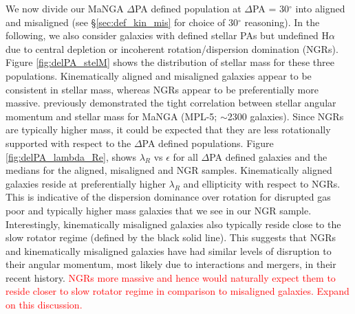 \documentclass[fleqn,usenatbib]{mnras}
\newcommand{\red}[1]{{\textcolor{red}{#1}}}
\begin{document}
We now divide our MaNGA $\Delta$PA defined population at $\Delta$PA = 30$^{\circ}$ into aligned and misaligned (see \S\ref{sec:def_kin_mis} for choice of 30$^{\circ}$ reasoning). In the following, we also consider galaxies with defined stellar PAs but undefined H$\alpha$ due to central depletion or incoherent rotation/dispersion domination (NGRs). Figure \ref{fig:delPA_stelM} shows the distribution of stellar mass for these three populations. Kinematically aligned and misaligned galaxies appear to be consistent in stellar mass, whereas NGRs appear to be preferentially more massive. \citet{graham2018} previously demonstrated the tight correlation between stellar angular momentum and stellar mass for MaNGA (MPL-5; $\sim$2300 galaxies). Since NGRs are typically higher mass, it could be expected that they are less rotationally supported with respect to the $\Delta$PA defined populations. Figure \ref{fig:delPA_lambda_Re}, shows $\lambda_R$ vs $\epsilon$ for all $\Delta$PA defined galaxies and the medians for the aligned, misaligned and NGR samples. Kinematically aligned galaxies reside at preferentially higher $\lambda_R$ and ellipticity with respect to NGRs. This is indicative of the dispersion dominance over rotation for disrupted gas poor and typically higher mass galaxies that we see in our NGR sample. Interestingly, kinematically misaligned galaxies also typically reside close to the slow rotator regime (defined by the black solid line). This suggests that NGRs and kinematically misaligned galaxies have had similar levels of disruption to their angular momentum, most likely due to interactions and mergers, in their recent history. \red{NGRs more massive and hence would naturally expect them to reside closer to slow rotator regime in comparison to misaligned galaxies. Expand on this discussion.}
\end{document}

